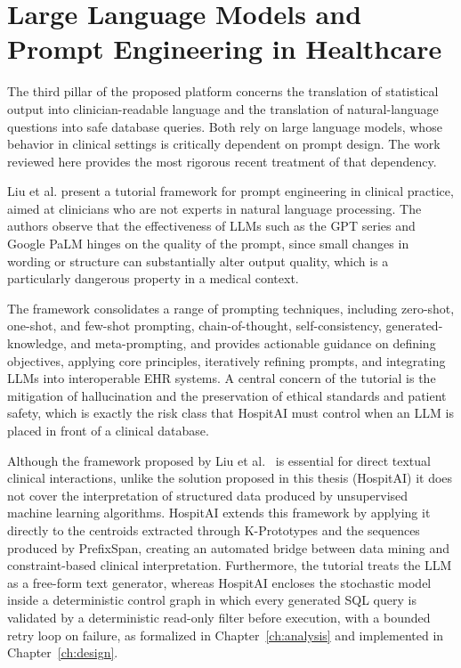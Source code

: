 \section{Large Language Models and Prompt Engineering in Healthcare}\label{sec:rw_llm}

The third pillar of the proposed platform concerns the translation of statistical output into clinician-readable language and the translation of natural-language questions into safe database queries. Both rely on large language models, whose behavior in clinical settings is critically dependent on prompt design. The work reviewed here provides the most rigorous recent treatment of that dependency.

Liu et al. \cite{liu2025} present a tutorial framework for prompt engineering in clinical practice, aimed at clinicians who are not experts in natural language processing. The authors observe that the effectiveness of LLMs such as the GPT series and Google PaLM hinges on the quality of the prompt, since small changes in wording or structure can substantially alter output quality, which is a particularly dangerous property in a medical context.

The framework consolidates a range of prompting techniques, including zero-shot, one-shot, and few-shot prompting, chain-of-thought, self-consistency, generated-knowledge, and meta-prompting, and provides actionable guidance on defining objectives, applying core principles, iteratively refining prompts, and integrating LLMs into interoperable EHR systems. A central concern of the tutorial is the mitigation of hallucination and the preservation of ethical standards and patient safety, which is exactly the risk class that HospitAI must control when an LLM is placed in front of a clinical database.

Although the framework proposed by Liu et al.\ \cite{liu2025} is essential for direct textual clinical interactions, unlike the solution proposed in this thesis (HospitAI) it does not cover the interpretation of structured data produced by unsupervised machine learning algorithms. HospitAI extends this framework by applying it directly to the centroids extracted through K-Prototypes and the sequences produced by PrefixSpan, creating an automated bridge between data mining and constraint-based clinical interpretation. Furthermore, the tutorial treats the LLM as a free-form text generator, whereas HospitAI encloses the stochastic model inside a deterministic control graph in which every generated SQL query is validated by a deterministic read-only filter before execution, with a bounded retry loop on failure, as formalized in Chapter~\ref{ch:analysis} and implemented in Chapter~\ref{ch:design}.

